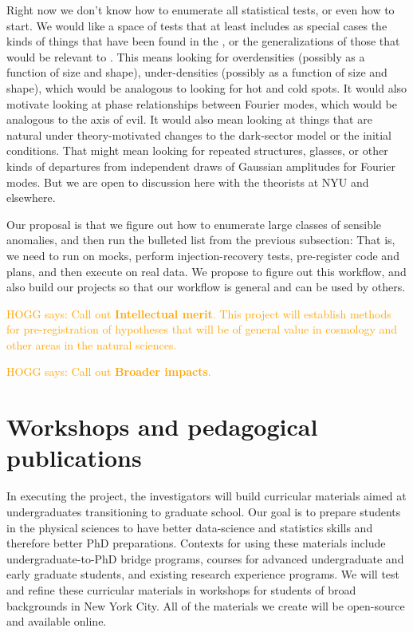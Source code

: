 \documentclass[12pt, fullpage, letterpaper]{article}
\newcommand{\HOGG}[1]{\textcolor{orange}{HOGG says: #1}}
\begin{document}
Right now we don't know how to enumerate all statistical tests, or even how
to start. We would like a space of tests that at least includes as special cases
the kinds of things that have been found in the \CMB, or the generalizations of
those that would be relevant to \LSS.
This means looking for overdensities (possibly as a function of size and shape), under-densities
(possibly as a function of size and shape), which would be analogous to looking for
hot and cold spots.
It would also motivate looking at phase relationships between Fourier modes,
which would be analogous to the axis of evil.
It would also mean looking at things that are natural under theory-motivated
changes to the dark-sector model or the initial conditions.
That might mean looking for repeated structures, glasses, or other kinds of
departures from independent draws of Gaussian amplitudes for Fourier modes.
But we are open to discussion here with the theorists at NYU and elsewhere.

Our proposal is that we figure out how to enumerate large classes of sensible
anomalies, and then run the bulleted list from the previous subsection:
That is, we need to run on mocks, perform injection-recovery tests, pre-register
code and plans, and then execute on real data.
We propose to figure out this workflow, and also build our projects so that our
workflow is general and can be used by others.

\HOGG{Call out \textbf{Intellectual merit}.
This project will establish methods for pre-registration of hypotheses that
will be of general value in cosmology and other areas in the natural
sciences.}

\HOGG{Call out \textbf{Broader impacts}.}

\section{Workshops and pedagogical publications}

In executing the project, the investigators will build curricular
materials aimed at undergraduates transitioning to graduate school.
Our goal is to prepare students
in the physical sciences to have better data-science and statistics
skills and therefore better PhD preparations.
Contexts for using these materials include undergraduate-to-PhD bridge programs, courses for advanced undergraduate and early graduate students, and existing research experience programs. 
We will test and refine these curricular materials in workshops for
students of broad backgrounds in New York City.
All of the materials we create will be open-source and available online. 
\end{document}

